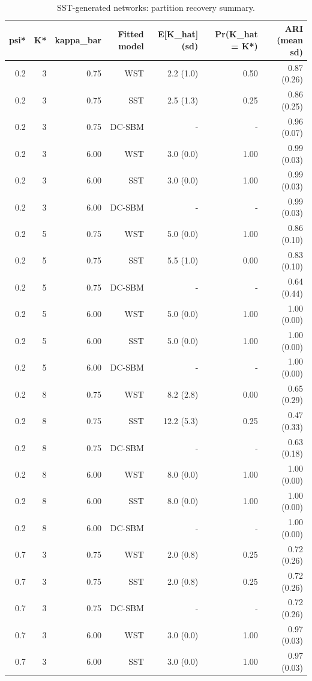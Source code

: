 \begin{table}[!h]
\centering
\caption{SST-generated networks: partition recovery summary.\\\label{tab:part-sst-full-simulation-crossfit-final-DemoKvar-run-20260224-155823}}
\centering
\begin{tabular}[t]{rrrrrrr}
\toprule
psi* & K* & kappa_bar & Fitted model & E[K_hat] (sd) & Pr(K_hat = K*) & ARI (mean sd)\\
\midrule
0.2 & 3 & 0.75 & WST & 2.2 (1.0) & 0.50 & 0.87 (0.26)\\
0.2 & 3 & 0.75 & SST & 2.5 (1.3) & 0.25 & 0.86 (0.25)\\
0.2 & 3 & 0.75 & DC-SBM & - & - & 0.96 (0.07)\\
0.2 & 3 & 6.00 & WST & 3.0 (0.0) & 1.00 & 0.99 (0.03)\\
0.2 & 3 & 6.00 & SST & 3.0 (0.0) & 1.00 & 0.99 (0.03)\\
0.2 & 3 & 6.00 & DC-SBM & - & - & 0.99 (0.03)\\
0.2 & 5 & 0.75 & WST & 5.0 (0.0) & 1.00 & 0.86 (0.10)\\
0.2 & 5 & 0.75 & SST & 5.5 (1.0) & 0.00 & 0.83 (0.10)\\
0.2 & 5 & 0.75 & DC-SBM & - & - & 0.64 (0.44)\\
0.2 & 5 & 6.00 & WST & 5.0 (0.0) & 1.00 & 1.00 (0.00)\\
0.2 & 5 & 6.00 & SST & 5.0 (0.0) & 1.00 & 1.00 (0.00)\\
0.2 & 5 & 6.00 & DC-SBM & - & - & 1.00 (0.00)\\
0.2 & 8 & 0.75 & WST & 8.2 (2.8) & 0.00 & 0.65 (0.29)\\
0.2 & 8 & 0.75 & SST & 12.2 (5.3) & 0.25 & 0.47 (0.33)\\
0.2 & 8 & 0.75 & DC-SBM & - & - & 0.63 (0.18)\\
0.2 & 8 & 6.00 & WST & 8.0 (0.0) & 1.00 & 1.00 (0.00)\\
0.2 & 8 & 6.00 & SST & 8.0 (0.0) & 1.00 & 1.00 (0.00)\\
0.2 & 8 & 6.00 & DC-SBM & - & - & 1.00 (0.00)\\
0.7 & 3 & 0.75 & WST & 2.0 (0.8) & 0.25 & 0.72 (0.26)\\
0.7 & 3 & 0.75 & SST & 2.0 (0.8) & 0.25 & 0.72 (0.26)\\
0.7 & 3 & 0.75 & DC-SBM & - & - & 0.72 (0.26)\\
0.7 & 3 & 6.00 & WST & 3.0 (0.0) & 1.00 & 0.97 (0.03)\\
0.7 & 3 & 6.00 & SST & 3.0 (0.0) & 1.00 & 0.97 (0.03)\\

\end{tabular}
\end{table}
